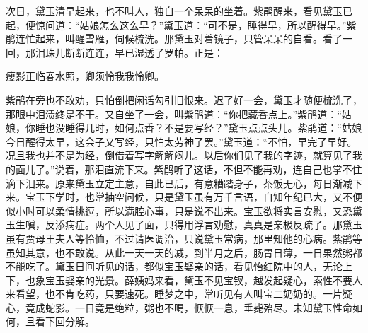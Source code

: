 \begin{parag}
    次日，黛玉清早起来，也不叫人，独自一个呆呆的坐着。紫鹃醒来，看见黛玉已起，便惊问道：“姑娘怎么这么早？”黛玉道：“可不是，睡得早，所以醒得早。”紫鹃连忙起来，叫醒雪雁，伺候梳洗。那黛玉对着镜子，只管呆呆的自看。看了一回，那泪珠儿断断连连，早已湿透了罗帕。正是：
\end{parag}


\begin{poem}
    \begin{pl}
        瘦影正临春水照，卿须怜我我怜卿。
    \end{pl}
\end{poem}


\begin{parag}
    紫鹃在旁也不敢劝，只怕倒把闲话勾引旧恨来。迟了好一会，黛玉才随便梳洗了，那眼中泪渍终是不干。又自坐了一会，叫紫鹃道：“你把藏香点上。”紫鹃道：“姑娘，你睡也没睡得几时，如何点香？不是要写经？”黛玉点点头儿。紫鹃道：“姑娘今日醒得太早，这会子又写经，只怕太劳神了罢。”黛玉道：“不怕，早完了早好。况且我也并不是为经，倒借着写字解解闷儿。以后你们见了我的字迹，就算见了我的面儿了。”说着，那泪直流下来。紫鹃听了这话，不但不能再劝，连自己也掌不住滴下泪来。原来黛玉立定主意，自此已后，有意糟踏身子，茶饭无心，每日渐减下来。宝玉下学时，也常抽空问候，只是黛玉虽有万千言语，自知年纪已大，又不便似小时可以柔情挑逗，所以满腔心事，只是说不出来。宝玉欲将实言安慰，又恐黛玉生嗔，反添病症。两个人见了面，只得用浮言劝慰，真真是亲极反疏了。那黛玉虽有贾母王夫人等怜恤，不过请医调治，只说黛玉常病，那里知他的心病。紫鹃等虽知其意，也不敢说。从此一天一天的减，到半月之后，肠胃日薄，一日果然粥都不能吃了。黛玉日间听见的话，都似宝玉娶亲的话，看见怡红院中的人，无论上下，也象宝玉娶亲的光景。薛姨妈来看，黛玉不见宝钗，越发起疑心，索性不要人来看望，也不肯吃药，只要速死。睡梦之中，常听见有人叫宝二奶奶的。一片疑心，竟成蛇影。一日竟是绝粒，粥也不喝，恹恹一息，垂毙殆尽。未知黛玉性命如何，且看下回分解。
\end{parag}